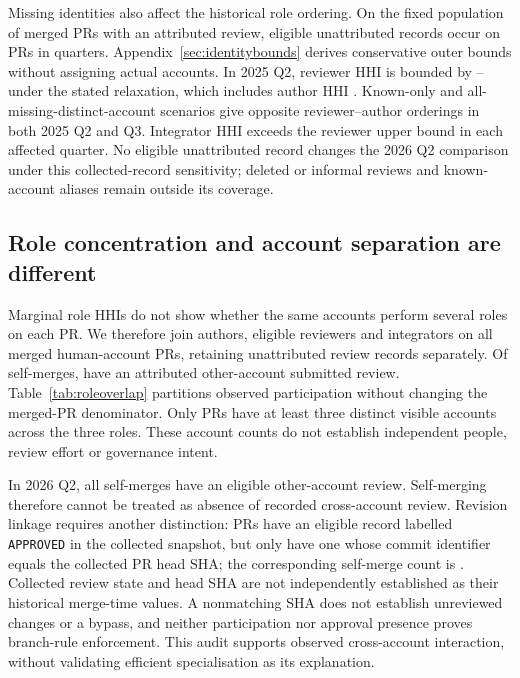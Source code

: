 \documentclass[11pt]{article}
\begin{document}
Missing identities also affect the historical role ordering. On the fixed
population of \MissingIdentityFixedPRs{} merged PRs with an attributed review,
\MissingIdentityRetainedRecords{} eligible unattributed records occur on
\MissingIdentityAffectedPRs{} PRs in \MissingIdentityAffectedQuarters{} quarters.
Appendix~\ref{sec:identitybounds} derives conservative outer bounds without
assigning actual accounts. In 2025 Q2, reviewer HHI is bounded by
\MissingIdentityQTwoLower{}--\MissingIdentityQTwoUpper{} under the stated
relaxation, which includes author HHI \MissingIdentityQTwoAuthor{}.
Known-only and all-missing-distinct-account scenarios give opposite
reviewer--author orderings in both 2025 Q2 and Q3. Integrator HHI exceeds the
reviewer upper bound in each affected quarter. No eligible unattributed record
changes the 2026 Q2 comparison under this collected-record sensitivity; deleted
or informal reviews and known-account aliases remain outside its coverage.

\subsection{Role concentration and account separation are different}
Marginal role HHIs do not show whether the same accounts perform several roles
on each PR. We therefore join authors, eligible reviewers and integrators on
all \HumanPRMerged{} merged human-account PRs, retaining unattributed review
records separately. Of \SelfMergeCount{} self-merges,
\SelfMergeReviewedCount{} have an attributed other-account submitted review.
Table~\ref{tab:roleoverlap} partitions observed participation without changing
the merged-PR denominator. Only \RoleOverlapThreeAccountCount{} PRs have at
least three distinct visible accounts across the three roles. These account
counts do not establish independent people, review effort or governance intent.

In 2026 Q2, all \RoleOverlapQTwoSelfCount{} self-merges have an eligible
other-account review. Self-merging therefore cannot be treated as absence of
recorded cross-account review. Revision linkage requires another distinction:
\RoleOverlapQTwoApprovalCount{} PRs have an eligible record labelled
\texttt{APPROVED} in the collected snapshot, but only
\RoleOverlapQTwoHeadApprovalCount{} have one whose commit identifier equals
the collected PR head SHA; the corresponding self-merge count is
\RoleOverlapQTwoSelfHeadApprovalCount{}.
Collected review state and head SHA are not independently established as their
historical merge-time values. A nonmatching SHA does not establish unreviewed
changes or a bypass, and neither participation nor approval presence proves
branch-rule enforcement. This audit supports observed cross-account interaction,
without validating efficient specialisation as its explanation.
\end{document}
